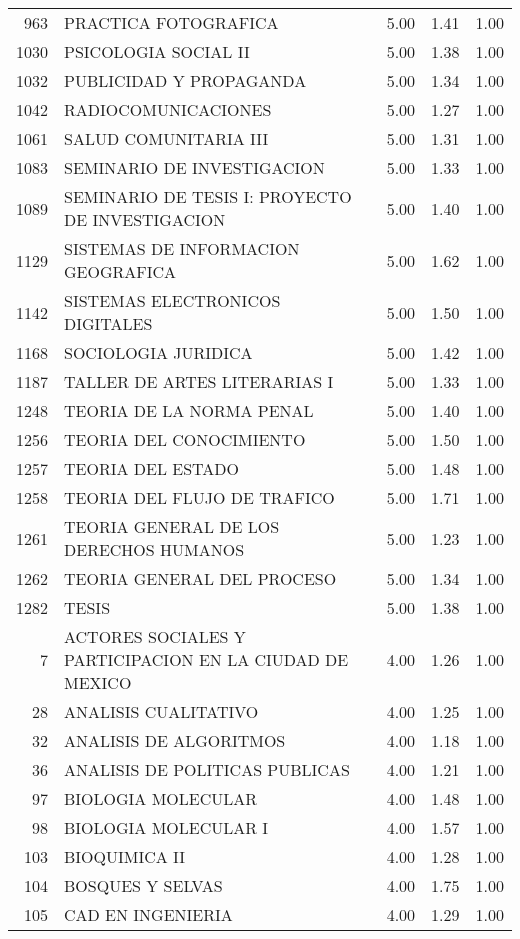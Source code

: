 \documentclass[12pt]{article}
\begin{document}
\begin{table}[ht]
\begin{tabular}{rlrrr}
  963 & PRACTICA FOTOGRAFICA & 5.00 & 1.41 & 1.00 \\ 
  1030 & PSICOLOGIA SOCIAL II & 5.00 & 1.38 & 1.00 \\ 
  1032 & PUBLICIDAD Y PROPAGANDA & 5.00 & 1.34 & 1.00 \\ 
  1042 & RADIOCOMUNICACIONES & 5.00 & 1.27 & 1.00 \\ 
  1061 & SALUD COMUNITARIA III & 5.00 & 1.31 & 1.00 \\ 
  1083 & SEMINARIO DE INVESTIGACION & 5.00 & 1.33 & 1.00 \\ 
  1089 & SEMINARIO DE TESIS I: PROYECTO DE INVESTIGACION & 5.00 & 1.40 & 1.00 \\ 
  1129 & SISTEMAS DE INFORMACION GEOGRAFICA & 5.00 & 1.62 & 1.00 \\ 
  1142 & SISTEMAS ELECTRONICOS DIGITALES & 5.00 & 1.50 & 1.00 \\ 
  1168 & SOCIOLOGIA JURIDICA & 5.00 & 1.42 & 1.00 \\ 
  1187 & TALLER DE ARTES LITERARIAS I & 5.00 & 1.33 & 1.00 \\ 
  1248 & TEORIA DE LA NORMA PENAL & 5.00 & 1.40 & 1.00 \\ 
  1256 & TEORIA DEL CONOCIMIENTO & 5.00 & 1.50 & 1.00 \\ 
  1257 & TEORIA DEL ESTADO & 5.00 & 1.48 & 1.00 \\ 
  1258 & TEORIA DEL FLUJO DE TRAFICO & 5.00 & 1.71 & 1.00 \\ 
  1261 & TEORIA GENERAL DE LOS DERECHOS HUMANOS & 5.00 & 1.23 & 1.00 \\ 
  1262 & TEORIA GENERAL DEL PROCESO & 5.00 & 1.34 & 1.00 \\ 
  1282 & TESIS & 5.00 & 1.38 & 1.00 \\ 
  7 & ACTORES SOCIALES Y PARTICIPACION EN LA CIUDAD DE MEXICO & 4.00 & 1.26 & 1.00 \\ 
  28 & ANALISIS CUALITATIVO & 4.00 & 1.25 & 1.00 \\ 
  32 & ANALISIS DE ALGORITMOS & 4.00 & 1.18 & 1.00 \\ 
  36 & ANALISIS DE POLITICAS PUBLICAS & 4.00 & 1.21 & 1.00 \\ 
  97 & BIOLOGIA MOLECULAR & 4.00 & 1.48 & 1.00 \\ 
  98 & BIOLOGIA MOLECULAR I & 4.00 & 1.57 & 1.00 \\ 
  103 & BIOQUIMICA II & 4.00 & 1.28 & 1.00 \\ 
  104 & BOSQUES Y SELVAS & 4.00 & 1.75 & 1.00 \\ 
  105 & CAD EN INGENIERIA & 4.00 & 1.29 & 1.00 \\ 

\end{tabular}
\end{table}
\end{document}
